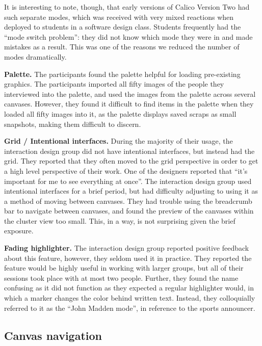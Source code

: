 It is interesting to note, though, that early versions of Calico Version Two had such separate modes, which was received with very mixed reactions when deployed to students in a software design class. Students frequently had the ``mode switch problem'': they did not know which mode they were in and made mistakes as a result. This was one of the reasons we reduced the number of modes dramatically.

\textbf{Palette.} The participants found the palette helpful for loading pre-existing graphics. The participants imported all fifty images of the people they interviewed into the palette, and used the images from the palette across several canvases. However, they found it difficult to find items in the palette when they loaded all fifty images into it, as the palette displays saved scraps as small snapshots, making them difficult to discern.

\textbf{Grid / Intentional interfaces.} During the majority of their usage, the interaction design group did not have intentional interfaces, but instead had the grid. They reported that they often moved to the grid perspective in order to get a high level perspective of their work. One of the designers reported that ``it's important for me to see everything at once''. The interaction design group used intentional interfaces for a brief period, but had difficulty adjusting to using it as a method of moving between canvases. They had trouble using the breadcrumb bar to navigate between canvases, and found the preview of the canvases within the cluster view too small. This, in a way, is not surprising given the brief exposure.

\textbf{Fading highlighter.} The interaction design group reported positive feedback about this feature, however, they seldom used it in practice. They reported the feature would be highly useful in working with larger groups, but all of their sessions took place with at most two people. Further, they found the name confusing as it did not function as they expected a regular highlighter would, in which a marker changes the color behind written text. Instead, they colloquially referred to it as the ``John Madden mode'', in reference to the sports announcer.

\subsection{Canvas navigation}

